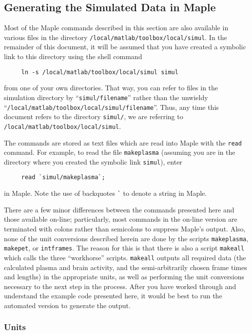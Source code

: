 \subsection{Generating the Simulated Data in Maple}

Most of the Maple commands described in this section are also
available in various files in the directory
\verb|/local/matlab/toolbox/local/simul|.  In the remainder of this
document, it will be assumed that you have created a symbolic link to
this directory using the shell command
\begin{verbatim}
     ln -s /local/matlab/toolbox/local/simul simul
\end{verbatim}
from one of your own directories.  That way, you can refer to files in
the simulation directory by ``\verb|simul/filename|'' rather than the
unwieldy ``\verb|/local/matlab/toolbox/local/simul/filename|''.  Thus,
any time this document refers to the directory \verb|simul/|, we are
referring to \verb|/local/matlab/toolbox/local/simul|.

The commands are stored as text files which are read into Maple with
the \verb|read| command.  For example, to read the file
\verb|makeplasma| (assuming you are in the directory where you created
the symbolic link \verb|simul|), enter 
\begin{verbatim}
     read `simul/makeplasma`;
\end{verbatim}
in Maple.  Note the use of backquotes \verb|`| to denote a string in Maple.

There are a few minor differences between the commands presented here
and those available on-line; particularly, most commands in the
on-line version are terminated with colons rather than semicolons to
suppress Maple's output.  Also, none of the unit conversions described
herein are done by the scripts \verb|makeplasma|, \verb|makepet|, or
\verb|intframes|.  The reason for this is that there is also a script 
\verb|makeall| which calls the three ``workhorse'' scripts.  
\verb|makeall| outputs all required data (the calculated plasma 
and brain activity, and the semi-arbitrarily chosen frame times and
lengths) in the appropriate units, as well as performing the unit
conversions necessary to the next step in the process.  After you have
worked through and understand the example code presented here, it
would be best to run the automated version to generate the output.

\subsubsection{Units}

